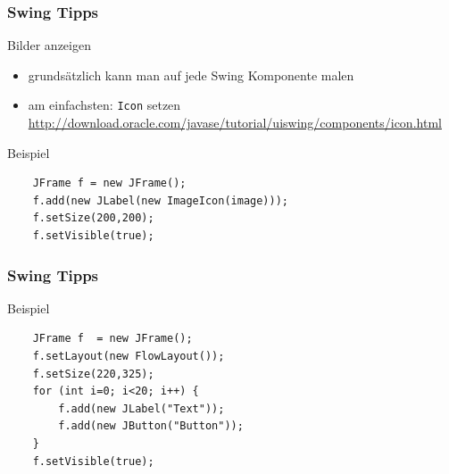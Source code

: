 \begin{frame}[fragile]
\frametitle{Swing Tipps}
\begin{block}{Bilder anzeigen}
\begin{itemize}
\item grundsätzlich kann man auf jede Swing Komponente malen \pause
\item am einfachsten: \texttt{Icon} setzen \\
\url{http://download.oracle.com/javase/tutorial/uiswing/components/icon.html}  \pause
\end{itemize}
\end{block}

\begin{block}{Beispiel}
\begin{lstlisting}
	JFrame f = new JFrame();
	f.add(new JLabel(new ImageIcon(image)));
	f.setSize(200,200);
	f.setVisible(true);
\end{lstlisting}
\end{block}
\end{frame}

\begin{frame}[fragile]
\frametitle{Swing Tipps}
\begin{block}{Beispiel}
\begin{lstlisting}
	JFrame f  = new JFrame();
	f.setLayout(new FlowLayout());
	f.setSize(220,325);
	for (int i=0; i<20; i++) {
		f.add(new JLabel("Text"));
		f.add(new JButton("Button"));
	}
	f.setVisible(true);
\end{lstlisting}
\end{block}
\end{frame}

